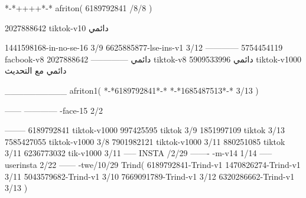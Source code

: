 *-*++++*-*
afriton(
6189792841 /8/8
)

2027888642 tiktok-v10
دائمي

1441598168-in-no-se-16 3/9
6625885877-lse-ins-v1 3/12
------------
5754454119 facbook-v8
دائمي
--------------
2027888642 tiktok-v8
دائمي
5909533996 tiktok-v1000
دائمي مع التحديث

__________
afriton1(
*-*6189792841*-*
*-*1685487513*-* 3/13
)


------
------------
-face-15 2/2

--------
6189792841 tiktok-v1000
997425595 tiktok 3/9
1851997109 tiktok 3/13
7585427055 tiktok-v1000 3/8
7901982121 tiktok-v1000 3/11
880251085 tiktok 3/11
6236773032 tik-v1000 3/11
-----
 INSTA /2/29
-------
-m-v14 1/14
-----
userinsta 2/22
------
-twe/10/29
Trind(
6189792841-Trind-v1 
1470826274-Trind-v1 3/11
5043579682-Trind-v1 3/10
7669091789-Trind-v1 3/12
6320286662-Trind-v1 3/13
)
